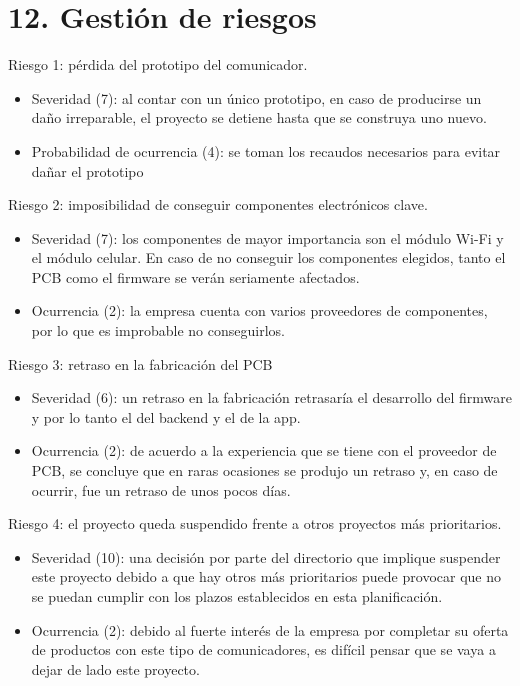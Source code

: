 \documentclass[
11pt, %
]{charter}
\begin{document}

\section{12. Gestión de riesgos}
\label{sec:riesgos}


Riesgo 1: pérdida del prototipo del comunicador.
\begin{itemize}
	\item Severidad (7): al contar con un único prototipo, en caso de producirse un daño irreparable, el proyecto se detiene hasta que se construya uno nuevo.
	\item Probabilidad de ocurrencia (4): se toman los recaudos necesarios para evitar dañar el prototipo
\end{itemize}   

Riesgo 2: imposibilidad de conseguir componentes electrónicos clave.
\begin{itemize}
	\item Severidad (7): los componentes de mayor importancia son el módulo Wi-Fi y el módulo celular. En caso de no conseguir los componentes elegidos, tanto el PCB como el firmware se verán seriamente afectados. 
	\item Ocurrencia (2): la empresa cuenta con varios proveedores de componentes, por lo que es improbable no conseguirlos.
\end{itemize}

Riesgo 3: retraso en la fabricación del PCB
\begin{itemize}
	\item Severidad (6): un retraso en la fabricación retrasaría el desarrollo del firmware y por lo tanto el del backend y el de la app.
	\item Ocurrencia (2): de acuerdo a la experiencia que se tiene con el proveedor de PCB, se concluye que en raras ocasiones se produjo un retraso y, en caso de ocurrir, fue un retraso de unos pocos días.
\end{itemize}

Riesgo 4: el proyecto queda suspendido frente a otros proyectos más prioritarios.
\begin{itemize}
	\item Severidad (10): una decisión por parte del directorio que implique suspender este proyecto debido a que hay otros más prioritarios puede provocar que no se puedan cumplir con los plazos establecidos en esta planificación.
	\item Ocurrencia (2): debido al fuerte interés de la empresa por completar su oferta de productos con este tipo de comunicadores, es difícil pensar que se vaya a dejar de lado este proyecto.
\end{itemize}
\end{document}
